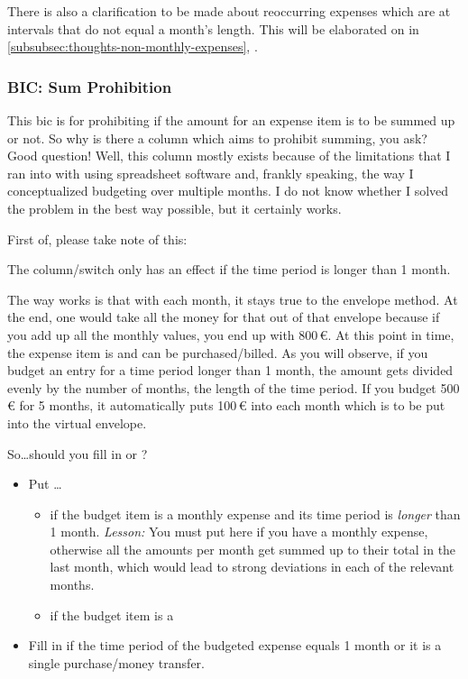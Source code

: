 There is also a clarification to be made about reoccurring expenses which are at intervals that do not equal a month's length.
This will be elaborated on in \autoref{subsubsec:thoughts-non-monthly-expenses}, .

\subsubsection{BIC: Sum Prohibition}
\label{subsubsec:budgeting-item-column-sum-prohibition}

This \ac{bic} is for prohibiting if the amount for an expense item is to be summed up or not.
So why is there a column which aims to prohibit summing, you ask?
Good question!
Well, this column mostly exists because of the limitations that I ran into with using spreadsheet software and, frankly speaking, the way I conceptualized budgeting over multiple months.
I do not know whether I solved the problem in the best way possible, but it certainly works.

First of, please take note of this:
\begin{specialnote}
	The column/switch  only has an effect if the time period is longer than 1 month.
\end{specialnote}

The way \tfn works is that with each month, it stays true to the envelope method.
At the end, one would take all the money for that out of that envelope because if you add up all the monthly values, you end up with 800\,€.
At this point in time, the expense item is  and can be purchased/billed.
As you will observe, if you budget an entry for a time period longer than 1 month, the amount gets divided evenly by the number of months, \ie the length of the time period.
If you budget 500\,€ for 5 months, it automatically puts 100\,€ into each month which is to be put into the virtual envelope.

So\ldots should you fill in  or ?
\begin{itemize}
	\item Put \ldots
	\begin{itemize}
		\item if the budget item is a monthly expense and its time period is \emph{longer} than 1 month.
		\emph{Lesson:} You must put  here if you have a monthly expense, otherwise all the amounts per month get summed up to their total in the last month, which would lead to strong deviations in each of the relevant months.
		\item if the budget item is a 
	\end{itemize}

	\item Fill in  if the time period of the budgeted expense equals 1 month or it is a single purchase/money transfer.
\end{itemize}

